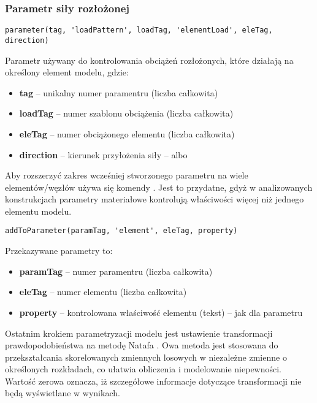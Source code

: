 \subsubsection*{Parametr siły rozłożonej}

\begin{lstlisting}
parameter(tag, 'loadPattern', loadTag, 'elementLoad', eleTag, direction)
\end{lstlisting}
Parametr używany do kontrolowania obciążeń rozłożonych, które działają na określony element modelu, gdzie:

\begin{itemize}
    \item \textbf{tag} – unikalny numer paramentru (liczba całkowita)
    \item \textbf{loadTag} – numer szablonu obciążenia (liczba całkowita)
    \item \textbf{eleTag} – numer obciążonego elementu (liczba całkowita)
    \item \textbf{direction} – kierunek przyłożenia siły –  albo 
\end{itemize}

Aby rozszerzyć zakres wcześniej stworzonego parametru na wiele elementów/węzłów używa się komendy
. Jest to przydatne, gdyż w analizowanych konstrukcjach
parametry materiałowe kontrolują właściwości więcej niż jednego elementu modelu.

\begin{lstlisting}
addToParameter(paramTag, 'element', eleTag, property)
\end{lstlisting}
Przekazywane parametry to:
\begin{itemize}
    \item \textbf{paramTag} – numer paramentru (liczba całkowita)
    \item \textbf{eleTag} – numer elementu (liczba całkowita)
    \item \textbf{property} – kontrolowana właściwość elementu (tekst) – jak dla parametru
\end{itemize}
Ostatnim krokiem parametryzacji modelu jest ustawienie transformacji prawdopodobieństwa na metodę Natafa .
Owa metoda jest stosowana do przekształcania skorelowanych zmiennych losowych w niezależne zmienne o określonych rozkładach, co ułatwia obliczenia i modelowanie niepewności.
Wartość zerowa oznacza, iż szczegółowe informacje dotyczące transformacji nie będą wyświetlane w wynikach.

